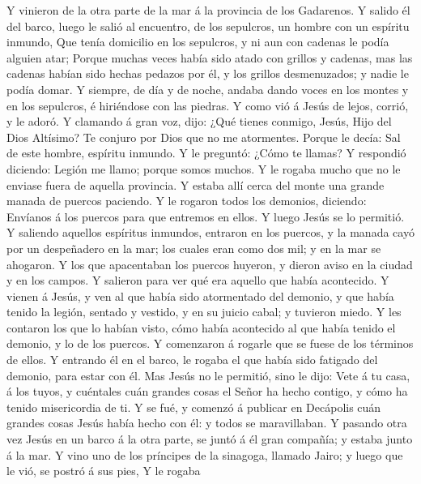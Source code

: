  Y vinieron de la otra parte de la mar á la provincia de los
Gadarenos.  Y salido él del barco, luego le salió al
encuentro, de los sepulcros, un hombre con un espíritu inmundo,
 Que tenía domicilio en los sepulcros, y ni aun con cadenas
le podía alguien atar;  Porque muchas veces había sido atado
con grillos y cadenas, mas las cadenas habían sido hechas pedazos por
él, y los grillos desmenuzados; y nadie le podía domar.  Y
siempre, de día y de noche, andaba dando voces en los montes y en los
sepulcros, é hiriéndose con las piedras.  Y como vió á Jesús
de lejos, corrió, y le adoró.  Y clamando á gran voz, dijo:
¿Qué tienes conmigo, Jesús, Hijo del Dios Altísimo? Te conjuro por Dios
que no me atormentes.  Porque le decía: Sal de este hombre,
espíritu inmundo.  Y le preguntó: ¿Cómo te llamas? Y
respondió diciendo: Legión me llamo; porque somos muchos. 
Y le rogaba mucho que no le enviase fuera de aquella provincia.
 Y estaba allí cerca del monte una grande manada de puercos
paciendo.  Y le rogaron todos los demonios, diciendo:
Envíanos á los puercos para que entremos en ellos.  Y luego
Jesús se lo permitió. Y saliendo aquellos espíritus inmundos, entraron
en los puercos, y la manada cayó por un despeñadero en la mar; los
cuales eran como dos mil; y en la mar se ahogaron.  Y los
que apacentaban los puercos huyeron, y dieron aviso en la ciudad y en
los campos. Y salieron para ver qué era aquello que había acontecido.
 Y vienen á Jesús, y ven al que había sido atormentado del
demonio, y que había tenido la legión, sentado y vestido, y en su juicio
cabal; y tuvieron miedo.  Y les contaron los que lo habían
visto, cómo había acontecido al que había tenido el demonio, y lo de los
puercos.  Y comenzaron á rogarle que se fuese de los
términos de ellos.  Y entrando él en el barco, le rogaba el
que había sido fatigado del demonio, para estar con él. 
Mas Jesús no le permitió, sino le dijo: Vete á tu casa, á los tuyos, y
cuéntales cuán grandes cosas el Señor ha hecho contigo, y cómo ha tenido
misericordia de ti.  Y se fué, y comenzó á publicar en
Decápolis cuán grandes cosas Jesús había hecho con él: y todos se
maravillaban.  Y pasando otra vez Jesús en un barco á la
otra parte, se juntó á él gran compañía; y estaba junto á la mar.
 Y vino uno de los príncipes de la sinagoga, llamado Jairo;
y luego que le vió, se postró á sus pies,  Y le rogaba
